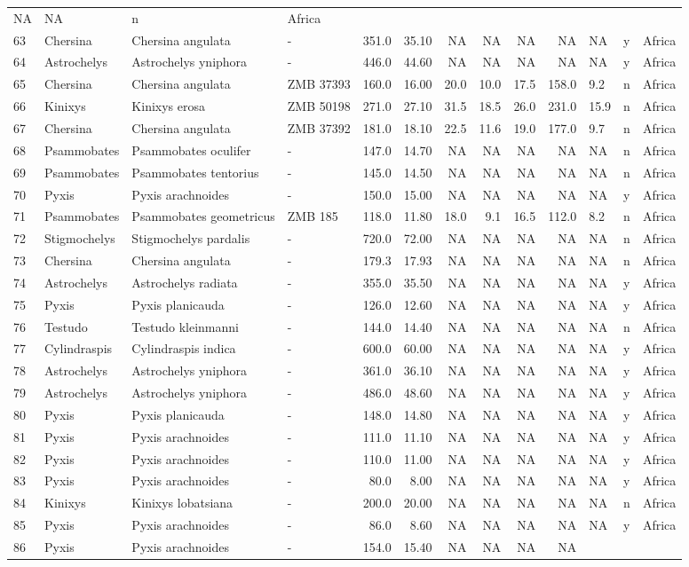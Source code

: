 \documentclass[]{article}
\begin{document}
\begin{longtable}[]{@{}llllrrrrrrlll@{}}
NA & NA & n & Africa\tabularnewline
63 & Chersina & Chersina angulata & - & 351.0 & 35.10 & NA & NA & NA &
NA & NA & y & Africa\tabularnewline
64 & Astrochelys & Astrochelys yniphora & - & 446.0 & 44.60 & NA & NA &
NA & NA & NA & y & Africa\tabularnewline
65 & Chersina & Chersina angulata & ZMB 37393 & 160.0 & 16.00 & 20.0 &
10.0 & 17.5 & 158.0 & 9.2 & n & Africa\tabularnewline
66 & Kinixys & Kinixys erosa & ZMB 50198 & 271.0 & 27.10 & 31.5 & 18.5 &
26.0 & 231.0 & 15.9 & n & Africa\tabularnewline
67 & Chersina & Chersina angulata & ZMB 37392 & 181.0 & 18.10 & 22.5 &
11.6 & 19.0 & 177.0 & 9.7 & n & Africa\tabularnewline
68 & Psammobates & Psammobates oculifer & - & 147.0 & 14.70 & NA & NA &
NA & NA & NA & n & Africa\tabularnewline
69 & Psammobates & Psammobates tentorius & - & 145.0 & 14.50 & NA & NA &
NA & NA & NA & n & Africa\tabularnewline
70 & Pyxis & Pyxis arachnoides & - & 150.0 & 15.00 & NA & NA & NA & NA &
NA & y & Africa\tabularnewline
71 & Psammobates & Psammobates geometricus & ZMB 185 & 118.0 & 11.80 &
18.0 & 9.1 & 16.5 & 112.0 & 8.2 & n & Africa\tabularnewline
72 & Stigmochelys & Stigmochelys pardalis & - & 720.0 & 72.00 & NA & NA
& NA & NA & NA & n & Africa\tabularnewline
73 & Chersina & Chersina angulata & - & 179.3 & 17.93 & NA & NA & NA &
NA & NA & n & Africa\tabularnewline
74 & Astrochelys & Astrochelys radiata & - & 355.0 & 35.50 & NA & NA &
NA & NA & NA & y & Africa\tabularnewline
75 & Pyxis & Pyxis planicauda & - & 126.0 & 12.60 & NA & NA & NA & NA &
NA & y & Africa\tabularnewline
76 & Testudo & Testudo kleinmanni & - & 144.0 & 14.40 & NA & NA & NA &
NA & NA & n & Africa\tabularnewline
77 & Cylindraspis & Cylindraspis indica & - & 600.0 & 60.00 & NA & NA &
NA & NA & NA & y & Africa\tabularnewline
78 & Astrochelys & Astrochelys yniphora & - & 361.0 & 36.10 & NA & NA &
NA & NA & NA & y & Africa\tabularnewline
79 & Astrochelys & Astrochelys yniphora & - & 486.0 & 48.60 & NA & NA &
NA & NA & NA & y & Africa\tabularnewline
80 & Pyxis & Pyxis planicauda & - & 148.0 & 14.80 & NA & NA & NA & NA &
NA & y & Africa\tabularnewline
81 & Pyxis & Pyxis arachnoides & - & 111.0 & 11.10 & NA & NA & NA & NA &
NA & y & Africa\tabularnewline
82 & Pyxis & Pyxis arachnoides & - & 110.0 & 11.00 & NA & NA & NA & NA &
NA & y & Africa\tabularnewline
83 & Pyxis & Pyxis arachnoides & - & 80.0 & 8.00 & NA & NA & NA & NA &
NA & y & Africa\tabularnewline
84 & Kinixys & Kinixys lobatsiana & - & 200.0 & 20.00 & NA & NA & NA &
NA & NA & n & Africa\tabularnewline
85 & Pyxis & Pyxis arachnoides & - & 86.0 & 8.60 & NA & NA & NA & NA &
NA & y & Africa\tabularnewline
86 & Pyxis & Pyxis arachnoides & - & 154.0 & 15.40 & NA & NA & NA & NA &

\end{longtable}
\end{document}

